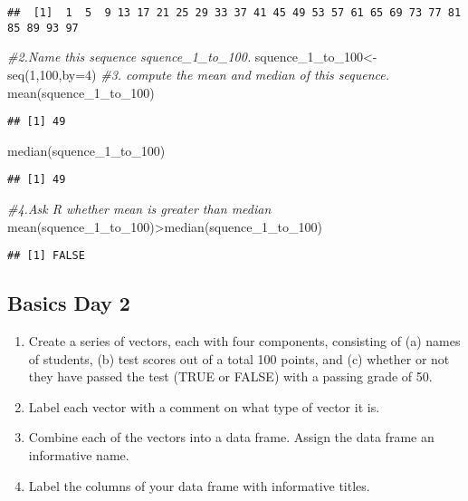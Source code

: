\documentclass[
]{article}
\newenvironment{Shaded}{\begin{snugshade}}{\end{snugshade}}
\newcommand{\AttributeTok}[1]{\textcolor[rgb]{0.77,0.63,0.00}{#1}}
\newcommand{\CommentTok}[1]{\textcolor[rgb]{0.56,0.35,0.01}{\textit{#1}}}
\newcommand{\DecValTok}[1]{\textcolor[rgb]{0.00,0.00,0.81}{#1}}
\newcommand{\FunctionTok}[1]{\textcolor[rgb]{0.00,0.00,0.00}{#1}}
\newcommand{\NormalTok}[1]{#1}
\newcommand{\OtherTok}[1]{\textcolor[rgb]{0.56,0.35,0.01}{#1}}
\newcommand{\SpecialCharTok}[1]{\textcolor[rgb]{0.00,0.00,0.00}{#1}}
\begin{document}
\begin{verbatim}
##  [1]  1  5  9 13 17 21 25 29 33 37 41 45 49 53 57 61 65 69 73 77 81 85 89 93 97
\end{verbatim}

\begin{Shaded}
\begin{Highlighting}[]
\CommentTok{\#2.Name this sequence \textquotesingle{}squence\_1\_to\_100\textquotesingle{}.}
\NormalTok{squence\_1\_to\_100}\OtherTok{\textless{}{-}}\FunctionTok{seq}\NormalTok{(}\DecValTok{1}\NormalTok{,}\DecValTok{100}\NormalTok{,}\AttributeTok{by=}\DecValTok{4}\NormalTok{) }
\CommentTok{\#3. compute the mean and median of this sequence.}
\FunctionTok{mean}\NormalTok{(squence\_1\_to\_100)  }
\end{Highlighting}
\end{Shaded}

\begin{verbatim}
## [1] 49
\end{verbatim}

\begin{Shaded}
\begin{Highlighting}[]
\FunctionTok{median}\NormalTok{(squence\_1\_to\_100) }
\end{Highlighting}
\end{Shaded}

\begin{verbatim}
## [1] 49
\end{verbatim}

\begin{Shaded}
\begin{Highlighting}[]
\CommentTok{\#4.Ask R whether mean is greater than median}
\FunctionTok{mean}\NormalTok{(squence\_1\_to\_100)}\SpecialCharTok{\textgreater{}}\FunctionTok{median}\NormalTok{(squence\_1\_to\_100)}
\end{Highlighting}
\end{Shaded}

\begin{verbatim}
## [1] FALSE
\end{verbatim}

\hypertarget{basics-day-2}{%
\subsection{Basics Day 2}\label{basics-day-2}}

\begin{enumerate}
\def\labelenumi{\arabic{enumi}.}
\setcounter{enumi}{4}
\item
  Create a series of vectors, each with four components, consisting of
  (a) names of students, (b) test scores out of a total 100 points, and
  (c) whether or not they have passed the test (TRUE or FALSE) with a
  passing grade of 50.
\item
  Label each vector with a comment on what type of vector it is.
\item
  Combine each of the vectors into a data frame. Assign the data frame
  an informative name.
\item
  Label the columns of your data frame with informative titles.
\end{enumerate}
\end{document}
